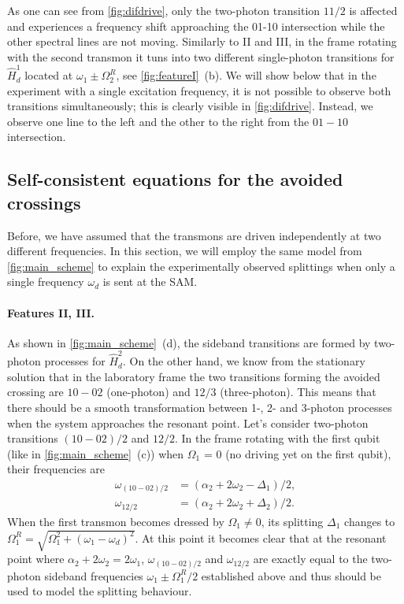 \documentclass[%
 pra,
 amsmath,amssymb,
 reprint,%
]{revtex4-1}
\begin{document}
As one can see from \autoref{fig:difdrive}, only the two-photon transition $11/2$ is affected and experiences a frequency shift approaching the 01-10 intersection while the other spectral lines are not moving. Similarly to II and III, in the frame rotating with the second transmon it tuns into two different single-photon transitions for $\hat H_d^1$ located at $\omega_1 \pm \Omega_2^R$, see \autoref{fig:featureI}~(b). We will show below that in the experiment with a single excitation frequency, it is not possible to observe both transitions simultaneously; this is clearly visible in \autoref{fig:difdrive}. Instead, we observe one line to the left and the other to the right from the $01-10$ intersection.




\subsection{Self-consistent equations for the avoided crossings}
\label{sec:münchhausen}

Before, we have assumed that the transmons are driven independently at two different frequencies. In this section, we will employ the same model from \autoref{fig:main_scheme} to explain the experimentally observed splittings when only a single frequency $\omega_d$ is sent at the SAM. 

\paragraph{Features II, III.}As shown in \autoref{fig:main_scheme}~(d), the sideband transitions are formed by two-photon processes for $\hat H_d^2$. On the other hand, we know from the stationary solution that in the laboratory frame the two transitions forming the avoided crossing are $10 - 02$ (one-photon) and $12/3$ (three-photon). This means that there should be a smooth transformation between 1-, 2- and 3-photon processes when the system approaches the resonant point. Let's consider two-photon transitions $(10 - 02)/2$ and $12/2$. In the frame rotating with the first qubit (like in \autoref{fig:main_scheme}~(c)) when $\Omega_1$ = 0 (no driving yet on the first qubit), their frequencies are
\begin{equation}
\begin{aligned}
\omega_{(10-02)/2} &= (\alpha_2 + 2 \omega_{2} - \Delta_1)/2,\\
 \omega_{12/2} &= (\alpha_2 + 2 \omega_{2} + \Delta_2)/2.
\end{aligned}
\end{equation}
When the first transmon becomes dressed by $\Omega_1 \neq 0$, its splitting $\Delta_1$ changes to $\Omega^R_1 =\sqrt{\Omega_{1}^2 + \left(\omega_{1} - \omega_{d}\right)^{2}}$. At this point it becomes clear that at the resonant point where $\alpha_2 + 2 \omega_{2} = 2\omega_1$, $\omega_{(10-02)/2}$ and $\omega_{12/2}$ are exactly equal to the two-photon sideband frequencies $\omega_1 \pm \Omega_1^R/2$ established above and thus should be used to model the splitting behaviour.
\end{document}
